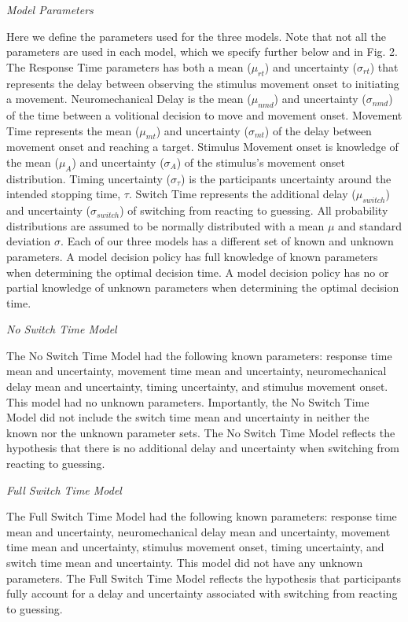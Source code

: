 \documentclass[12pt,letterpaper]{article}
\begin{document}
\emph{Model Parameters}

Here we define the parameters used for the three models. Note that not all the parameters are used in each model, which we specify further below and in Fig. 2. The Response Time parameters has both a mean ($\mu_{rt}$) and uncertainty ($\sigma_{rt}$) that represents the delay between observing the stimulus movement onset to initiating a movement. Neuromechanical Delay is the mean ($\mu_{nmd}$) and uncertainty ($\sigma_{nmd}$) of the time between a volitional decision to move and movement onset. Movement Time represents the mean ($\mu_{mt}$) and uncertainty ($\sigma_{mt}$) of the delay between movement onset and reaching a target. Stimulus Movement onset is knowledge of the mean ($\mu_{A}$) and uncertainty ($\sigma_{A}$) of the stimulus’s movement onset distribution. Timing uncertainty ($\sigma_{\tau}$) is the participants uncertainty around the intended stopping time, $\tau$. Switch Time represents the additional delay ($\mu_{switch}$) and uncertainty  ($\sigma_{switch}$) of switching from reacting to guessing. All probability distributions are assumed to be normally distributed with a mean $\mu$ and standard deviation $\sigma$.  Each of our three models has a different set of known and unknown parameters. A model decision policy has full knowledge of known parameters when determining the optimal decision time. A model decision policy has no or partial knowledge of unknown parameters when determining the optimal decision time.

\emph{No Switch Time Model}

The No Switch Time Model had the following known parameters: response time mean and uncertainty, movement time mean and uncertainty, neuromechanical delay mean and uncertainty, timing uncertainty, and stimulus movement onset. This model had no unknown parameters. Importantly, the No Switch Time Model did not include the switch time mean and uncertainty in neither the known nor the unknown parameter sets. The No Switch Time Model reflects the hypothesis that there is no additional delay and uncertainty when switching from reacting to guessing.

\emph{Full Switch Time Model}

The Full Switch Time Model had the following known parameters: response time mean and uncertainty, neuromechanical delay mean and uncertainty, movement time mean and uncertainty, stimulus movement onset, timing uncertainty, and switch time mean and uncertainty. This model did not have any unknown parameters. The Full Switch Time Model reflects the hypothesis that participants fully account for a delay and uncertainty associated with switching from reacting to guessing.
\end{document}
